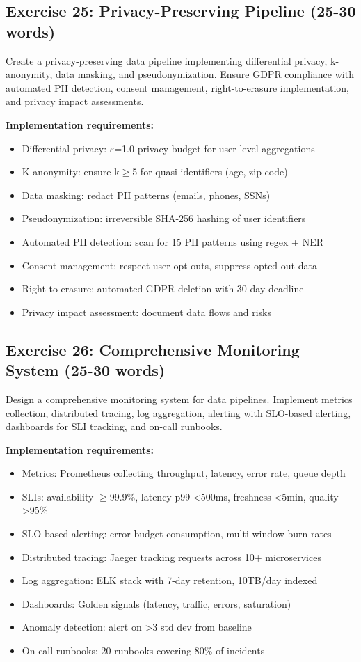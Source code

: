 \subsection{Exercise 25: Privacy-Preserving Pipeline (25-30 words)}

Create a privacy-preserving data pipeline implementing differential privacy, k-anonymity, data masking, and pseudonymization. Ensure GDPR compliance with automated PII detection, consent management, right-to-erasure implementation, and privacy impact assessments.

\textbf{Implementation requirements:}
\begin{itemize}
    \item Differential privacy: \ensuremath{\varepsilon}=1.0 privacy budget for user-level aggregations
    \item K-anonymity: ensure k\ensuremath{\geq}5 for quasi-identifiers (age, zip code)
    \item Data masking: redact PII patterns (emails, phones, SSNs)
    \item Pseudonymization: irreversible SHA-256 hashing of user identifiers
    \item Automated PII detection: scan for 15 PII patterns using regex + NER
    \item Consent management: respect user opt-outs, suppress opted-out data
    \item Right to erasure: automated GDPR deletion with 30-day deadline
    \item Privacy impact assessment: document data flows and risks
\end{itemize}

\subsection{Exercise 26: Comprehensive Monitoring System (25-30 words)}

Design a comprehensive monitoring system for data pipelines. Implement metrics collection, distributed tracing, log aggregation, alerting with SLO-based alerting, dashboards for SLI tracking, and on-call runbooks.

\textbf{Implementation requirements:}
\begin{itemize}
    \item Metrics: Prometheus collecting throughput, latency, error rate, queue depth
    \item SLIs: availability \ensuremath{\geq}99.9\%, latency p99 <500ms, freshness <5min, quality >95\%
    \item SLO-based alerting: error budget consumption, multi-window burn rates
    \item Distributed tracing: Jaeger tracking requests across 10+ microservices
    \item Log aggregation: ELK stack with 7-day retention, 10TB/day indexed
    \item Dashboards: Golden signals (latency, traffic, errors, saturation)
    \item Anomaly detection: alert on >3 std dev from baseline
    \item On-call runbooks: 20 runbooks covering 80\% of incidents
\end{itemize}

